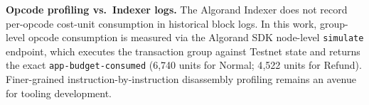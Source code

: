 
\item \textbf{Opcode profiling vs.\ Indexer logs.} The Algorand Indexer does not record per-opcode cost-unit consumption in historical block logs. In this work, group-level opcode consumption is measured via the Algorand SDK node-level \texttt{simulate} endpoint, which executes the transaction group against Testnet state and returns the exact \texttt{app-budget-consumed} (6{,}740 units for Normal; 4{,}522 units for Refund). Finer-grained instruction-by-instruction disassembly profiling remains an avenue for tooling development.
